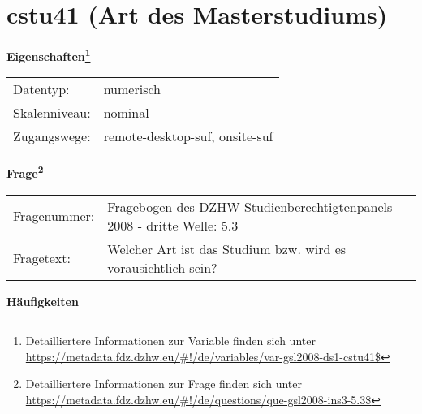
    \setcounter{footnote}{0}

    \vspace*{-1.8cm}
	\section{cstu41 (Art des Masterstudiums)}
	\label{section:cstu41}



    \vspace*{0.5cm}
    \noindent\textbf{Eigenschaften\footnote{Detailliertere Informationen zur Variable finden sich unter
		\url{https://metadata.fdz.dzhw.eu/\#!/de/variables/var-gsl2008-ds1-cstu41$}}}\\
	\begin{tabularx}{\hsize}{@{}lX}
	Datentyp: & numerisch \\
	Skalenniveau: & nominal \\
	Zugangswege: &
	  remote-desktop-suf, 
	  onsite-suf
 \\
    \end{tabularx}



				\vspace*{0.5cm}
                \noindent\textbf{Frage\footnote{Detailliertere Informationen zur Frage finden sich unter
		              \url{https://metadata.fdz.dzhw.eu/\#!/de/questions/que-gsl2008-ins3-5.3$}}}\\
				\begin{tabularx}{\hsize}{@{}lX}
					Fragenummer: &
					  Fragebogen des DZHW-Studienberechtigtenpanels 2008 - dritte Welle:
					  5.3
 \\
					Fragetext: & Welcher Art ist das Studium bzw. wird es vorausichtlich sein? \\
				\end{tabularx}





        		\vspace*{0.5cm}
                \noindent\textbf{Häufigkeiten}

